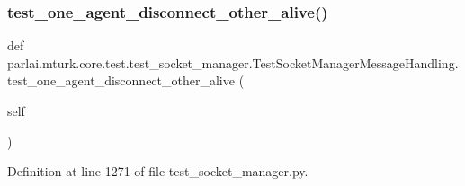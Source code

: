 \subsubsection{\texorpdfstring{test\+\_\+one\+\_\+agent\+\_\+disconnect\+\_\+other\+\_\+alive()}{test\_one\_agent\_disconnect\_other\_alive()}}
{\footnotesize\ttfamily def parlai.\+mturk.\+core.\+test.\+test\+\_\+socket\+\_\+manager.\+Test\+Socket\+Manager\+Message\+Handling.\+test\+\_\+one\+\_\+agent\+\_\+disconnect\+\_\+other\+\_\+alive (\begin{DoxyParamCaption}\item[{}]{self }\end{DoxyParamCaption})}



Definition at line 1271 of file test\+\_\+socket\+\_\+manager.\+py.


